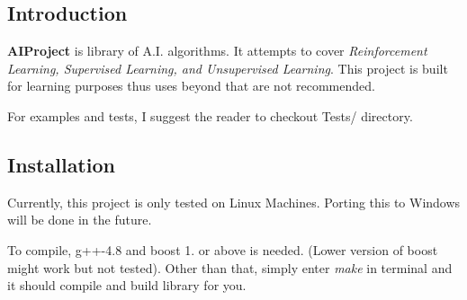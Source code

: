 \subsection*{Introduction}

{\bfseries A\-I\-Project} is library of A.\-I. algorithms. It attempts to cover {\itshape Reinforcement Learning, Supervised Learning, and Unsupervised Learning}. This project is built for learning purposes thus uses beyond that are not recommended.

For examples and tests, I suggest the reader to checkout Tests/ directory.

\subsection*{Installation}

Currently, this project is only tested on Linux Machines. Porting this to Windows will be done in the future.

To compile, g++-\/4.8 and boost 1. or above is needed. (Lower version of boost might work but not tested). Other than that, simply enter {\itshape make} in terminal and it should compile and build library for you. 